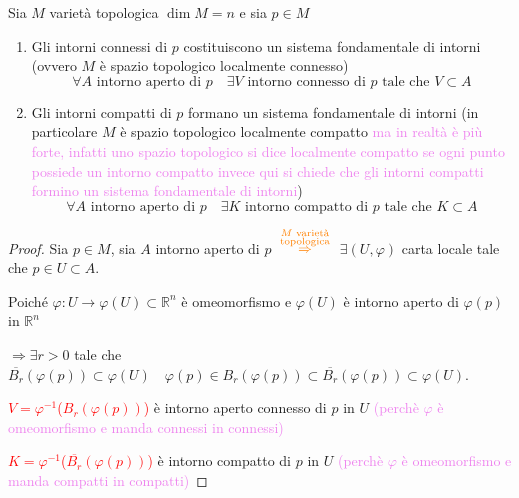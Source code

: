         \begin{proposizione}
        Sia $M$ varietà topologica $\dim M=n$ e sia $p \in M$ 
        \begin{enumerate}
            \item Gli intorni connessi di $p$ costituiscono un sistema fondamentale di intorni \textcolor{blu}{(ovvero $M$ è spazio topologico localmente connesso)} 
            \begin{equation}
            \label{eq:M_varieta_topologica_localmente_connessa}
            \forall A \text{ intorno aperto di } p \quad \exists V \text{ intorno connesso di } p \text{ tale che } V \subset A
            \end{equation}
            \item Gli intorni compatti di $p$ formano un sistema fondamentale di intorni \textcolor{blu}{(in particolare $M$ è spazio topologico localmente compatto
            \textcolor{violet}{ma in realtà è più forte, infatti uno spazio topologico si dice localmente compatto se ogni punto possiede un intorno compatto invece qui si chiede 
            che gli intorni compatti formino un sistema fondamentale di intorni})} 
            \begin{equation}
            \label{eq:M_varieta_topologica_intorni_compatti_sistema_fondamentale_di_intorni}
                 \forall A \text{ intorno aperto di } p \quad \exists K \text{ intorno compatto di } p \text{ tale che } K \subset A
            \end{equation}
        \end{enumerate}
        \end{proposizione}

        \begin{proof}
        \mbox{}

            Sia $p \in M$, sia $A$ intorno aperto di $p$ $\textcolor{orange}{\overset{\substack{M \text{ varietà} \\  \text{ topologica }}}{\Rightarrow}}$ 
            $\exists(U, \varphi)$ carta locale tale che $p \in U \subset A$.

            Poiché $\varphi \colon U \to \varphi(U) \subset \mathbb{R}^n$ è omeomorfismo e $\varphi(U)$ è intorno aperto di $\varphi(p)$ in $\mathbb{R}^n$ 
            
            $\Rightarrow \exists r>0$ tale che $\overline{B_r}(\varphi(p)) \subset \varphi(U) \quad \varphi(p) \in B_r(\varphi(p)) \subset \overline{B_r}(\varphi(p)) \subset \varphi(U)$.

            \textcolor{red}{$V=\varphi^{-1}$($B_r(\varphi(p))$)} è intorno aperto connesso di $p$ in $U$ \textcolor{violet}{(perchè $\varphi$ è omeomorfismo e manda connessi in connessi)}

            \textcolor{red}{$K=\varphi^{-1}$($\overline{B_r}(\varphi(p))$)} è intorno compatto di $p$ in $U$ \textcolor{violet}{(perchè $\varphi$ è omeomorfismo e manda compatti in compatti)}
        \end{proof}

